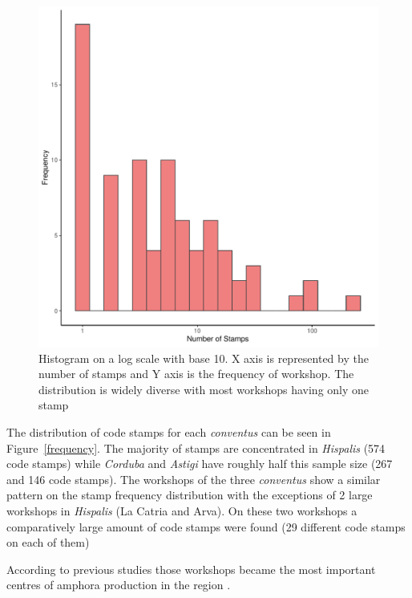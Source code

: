 \documentclass[review]{elsarticle}
\newcommand{\memo}[2]{\textcolor{#1}{#2}}
\newcommand{\xavi}[1]{\memo{magenta}{XRC: #1\\}}
\begin{document}
\begin{figure}[htp]
	\centering
\includegraphics[width=\linewidth]{figs/frequencystamp.pdf}
\caption{Histogram on a log scale with base 10. X axis is represented by the number of stamps and Y axis is the frequency of workshop. The distribution is widely diverse with most workshops having only one stamp}
\label{stamps}
\end{figure} 


The distribution of code stamps for each \textit{conventus} can be seen in Figure~\ref{frequency}. The majority of stamps are concentrated in \textit{Hispalis} (574 code stamps) while \textit{Corduba} and \textit{Astigi} have roughly half this sample size (267 and 146 code stamps). The workshops of the three \textit{conventus} show a similar pattern on the stamp frequency distribution with the exceptions of 2 large workshops in \textit{Hispalis} (La Catria and Arva). On these two workshops a comparatively large amount of code stamps were found (29 different code stamps on each of them)


According to previous studies those workshops became the most important centres of amphora production in the region \citep{rodriguez_economioleicola_1977,
arva_1997}.
\end{document}
